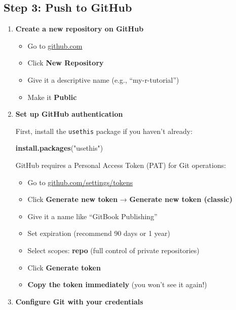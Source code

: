\documentclass[
]{book}
\newenvironment{Shaded}{\begin{snugshade}}{\end{snugshade}}
\newcommand{\FunctionTok}[1]{\textcolor[rgb]{0.13,0.29,0.53}{\textbf{#1}}}
\newcommand{\NormalTok}[1]{#1}
\newcommand{\StringTok}[1]{\textcolor[rgb]{0.31,0.60,0.02}{#1}}
\providecommand{\tightlist}{%
  \setlength{\itemsep}{0pt}\setlength{\parskip}{0pt}}
\begin{document}
\subsection{Step 3: Push to GitHub}\label{step-3-push-to-github}

\begin{enumerate}
\def\labelenumi{\arabic{enumi}.}
\item
  \textbf{Create a new repository on GitHub}

  \begin{itemize}
  \tightlist
  \item
    Go to \href{https://github.com}{github.com}
  \item
    Click \textbf{New Repository}
  \item
    Give it a descriptive name (e.g., ``my-r-tutorial'')
  \item
    Make it \textbf{Public}
  \end{itemize}
\item
  \textbf{Set up GitHub authentication}

  First, install the \texttt{usethis} package if you haven't already:

\begin{Shaded}
\begin{Highlighting}[]
\FunctionTok{install.packages}\NormalTok{(}\StringTok{"usethis"}\NormalTok{)}
\end{Highlighting}
\end{Shaded}

  GitHub requires a Personal Access Token (PAT) for Git operations:

  \begin{itemize}
  \tightlist
  \item
    Go to \href{https://github.com/settings/tokens}{github.com/settings/tokens}
  \item
    Click \textbf{Generate new token} → \textbf{Generate new token (classic)}
  \item
    Give it a name like ``GitBook Publishing''
  \item
    Set expiration (recommend 90 days or 1 year)
  \item
    Select scopes: \textbf{repo} (full control of private repositories)
  \item
    Click \textbf{Generate token}
  \item
    \textbf{Copy the token immediately} (you won't see it again!)
  \end{itemize}
\item
  \textbf{Configure Git with your credentials}


\end{enumerate}
\end{document}
